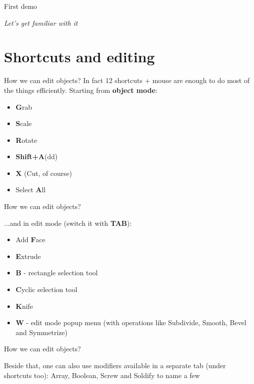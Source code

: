 \documentclass{beamer}
\begin{document}
\begin{frame}{First demo}

\centering \Huge
\emph{Let's get familiar with it}

\end{frame}

\section{Shortcuts and editing}

\begin{frame}{How we can edit objects?}
In fact 12 shortcuts + mouse are enough
to do most of the things efficiently. Starting from \textbf{object mode}:
\begin{itemize}
\item \textbf{G}rab
\item \textbf{S}cale
\item \textbf{R}otate
\item \textbf{Shift+A}(dd)
\item \textbf{X} (Cut, of course)
\item Select \textbf{A}ll
\end{itemize}

\end{frame}


\begin{frame}{How we can edit objects?}

...and in edit mode (switch it with \textbf{TAB}):
\begin{itemize}
\item Add \textbf{F}ace
\item \textbf{E}xtrude
\item \textbf{B} - rectangle selection tool
\item \textbf{C}yclic selection tool
\item \textbf{K}nife
\item \textbf{W} - edit mode popup menu (with operations like Subdivide, Smooth, Bevel and Symmetrize)

\end{itemize}

\end{frame}

\begin{frame}{How we can edit objects?}

\centering \Large
{Beside that, one can also use modifiers available in a separate tab (under shortcuts too): Array, Boolean, Screw and Soldify to name a few}

\end{frame}
\end{document}
